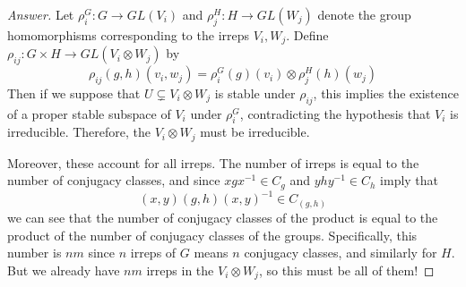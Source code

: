\documentclass[../notes.tex]{subfiles}
\begin{document}
\begin{enumerate}
    \begin{proof}[Answer]
        Let $\rho_i^G:G\to GL(V_i)$ and $\rho_j^H:H\to GL(W_j)$ denote the group homomorphisms corresponding to the irreps $V_i,W_j$. Define $\rho_{ij}:G\times H\to GL(V_i\otimes W_j)$ by
        \begin{equation*}
            \rho_{ij}(g,h)(v_i,w_j) = \rho_i^G(g)(v_i)\otimes\rho_j^H(h)(w_j)
        \end{equation*}
        Then if we suppose that $U\subsetneq V_i\otimes W_j$ is stable under $\rho_{ij}$, this implies the existence of a proper stable subspace of $V_i$ under $\rho_i^G$, contradicting the hypothesis that $V_i$ is irreducible. Therefore, the $V_i\otimes W_j$ must be irreducible.\par
        Moreover, these account for all irreps. The number of irreps is equal to the number of conjugacy classes, and since $xgx^{-1}\in C_g$ and $yhy^{-1}\in C_h$ imply that
        \begin{equation*}
            (x,y)(g,h)(x,y)^{-1} \in C_{(g,h)}
        \end{equation*}
        we can see that the number of conjugacy classes of the product is equal to the product of the number of conjugacy classes of the groups. Specifically, this number is $nm$ since $n$ irreps of $G$ means $n$ conjugacy classes, and similarly for $H$. But we already have $nm$ irreps in the $V_i\otimes W_j$, so this must be all of them!
    \end{proof}
\end{enumerate}
\end{document}
